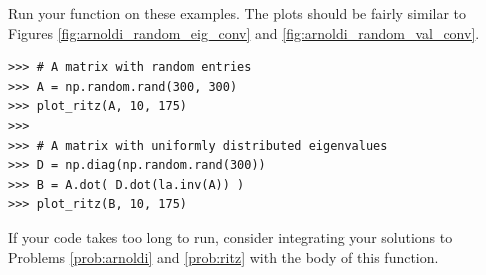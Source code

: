 \begin{problem}
Run your function on these examples.
The plots should be fairly similar to Figures \ref{fig:arnoldi_random_eig_conv} and \ref{fig:arnoldi_random_val_conv}.

\begin{lstlisting}
>>> # A matrix with random entries
>>> A = np.random.rand(300, 300)
>>> plot_ritz(A, 10, 175)
>>>
>>> # A matrix with uniformly distributed eigenvalues
>>> D = np.diag(np.random.rand(300))
>>> B = A.dot( D.dot(la.inv(A)) )
>>> plot_ritz(B, 10, 175)
\end{lstlisting}

If your code takes too long to run, consider integrating your solutions to Problems \ref{prob:arnoldi} and \ref{prob:ritz} with the body of this function.
\end{problem}


